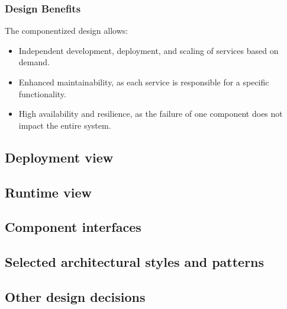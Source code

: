 \documentclass[11pt,twoside]{article}
\begin{document}
\subsubsection{Design Benefits}
The componentized design allows:
\begin{itemize}
    \item Independent development, deployment, and scaling of services based on demand.
    \item Enhanced maintainability, as each service is responsible for a specific functionality.
    \item High availability and resilience, as the failure of one component does not impact the entire system.
\end{itemize}

	\subsection{Deployment view}
	\subsection{Runtime view}
	\subsection{Component interfaces}
	\subsection{Selected architectural styles and patterns}
	\subsection{Other design decisions}

\newpage
\end{document}
